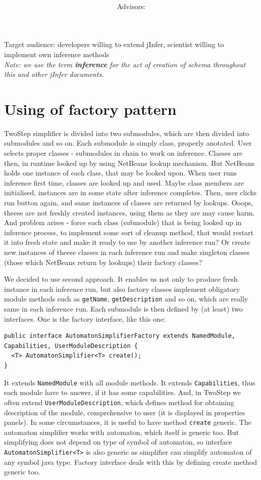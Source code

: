\documentclass[a4paper,10pt,oneside]{article}
\title{\bf\mftitle}
\author{\mfauthor \\ Advisors: \mfadvisor}
\date{\mfplacedate}
\newcommand{\code}[1]{\texttt{#1}}
\begin{document}
\maketitle
Target audience: developers willing to extend jInfer, scientist willing to implement own inference methods\\

\emph{Note: we use the term \textbf{inference} for the act of creation of schema throughout this and other jInfer documents.}

\section{Using of factory pattern}
TwoStep simplifier is divided into two submodules, which are then divided into submodules and so on.
Each submodule is simply class, properly anotated.
User selects proper classes - submodules in chain to work on inference.
Classes are then, in runtime looked up by using NetBeans lookup mechanism.
But NetBeans holds one instance of each class, that may be looked upon.
When user runs inference first time, classes are looked up and used.
Maybe class members are initialised, instances are in some state after inference completes.
Then, user clicks run button again, and same instances of classes are returned by lookups.
Ooops, theese are not freshly created instances, using them as they are may cause harm.
And problem arises - force each class (submodule) that is being looked up in inference process, to implement
some sort of cleanup method, that would restart it into fresh state and make it ready to use by another 
inference run? Or create new instances of theese classes in each inference run and make singleton classes (those which NetBeans return by lookups) their factory classes?

We decided to use second approach. 
It enables us not only to produce fresh instance in each inference run, but also factory classes implement obligatory
module methods such as \code{getName}, \code{getDescription} and so on, which are really same in each inference run.
Each submodule is then defined by (at least) two interfaces.
One is the factory interface, like this one:
\begin{verbatim}
public interface AutomatonSimplifierFactory extends NamedModule, Capabilities, UserModuleDescription {
  <T> AutomatonSimplifier<T> create();
}
\end{verbatim}
It extends \code{NamedModule} with all module methods.
It extends \code{Capabilities}, thus each module have to answer, if it has some capabilities.
And, in TwoStep we often extend \code{UserModuleDescription}, which defines method for obtaining description of the module, comprehensive to user (it is displayed in properties panels).
In some circumstances, it is useful to have method \code{create} generic.
The automaton simplifier works with automaton, which itself is generic too.
But simplifying does not depend on type of symbol of automaton, so interface \code{AutomatonSimplifier<T>}
is also generic as simplifier can simplify automaton of any symbol java type.
Factory interface deals with this by defining create method generic too.
\end{document}
